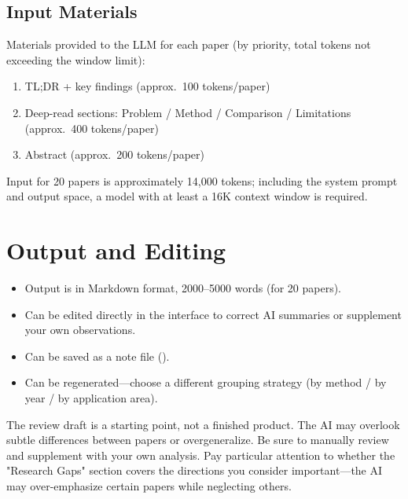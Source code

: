 \subsection{Input Materials}

Materials provided to the LLM for each paper (by priority, total tokens not exceeding the window
limit):

\begin{enumerate}
  \item TL;DR + key findings (approx.\ 100 tokens/paper)
  \item Deep-read sections: Problem / Method / Comparison / Limitations (approx.\ 400 tokens/paper)
  \item Abstract (approx.\ 200 tokens/paper)
\end{enumerate}

Input for 20 papers is approximately 14,000 tokens; including the system prompt and output space,
a model with at least a 16K context window is required.

\section{Output and Editing}

\begin{itemize}
  \item Output is in Markdown format, 2000--5000 words (for 20 papers).
  \item Can be edited directly in the interface to correct AI summaries or supplement your own
    observations.
  \item Can be saved as a note file ().
  \item Can be regenerated---choose a different grouping strategy (by method / by year / by
    application area).
\end{itemize}

\begin{warnbox}
The review draft is a starting point, not a finished product. The AI may overlook subtle
differences between papers or overgeneralize. Be sure to manually review and supplement with your
own analysis. Pay particular attention to whether the "Research Gaps" section covers the directions
you consider important---the AI may over-emphasize certain papers while neglecting others.
\end{warnbox}
